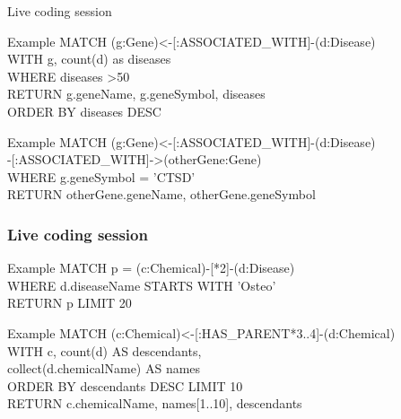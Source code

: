 \documentclass[12pt]{beamer}
\begin{document}
    \begin{frame}{Live coding session}
        \begin{block}{Example}
            MATCH (g:Gene)\textless-[:ASSOCIATED\_WITH]-(d:Disease)\\
            \hspace{1cm} WITH g, count(d) as diseases\\
            \hspace{1cm} WHERE diseases \textgreater 50\\
            \hspace{1cm} RETURN g.geneName, g.geneSymbol, diseases\\
            \hspace{1cm} ORDER BY diseases DESC
        \end{block}
        \begin{block}{Example}
            MATCH (g:Gene)\textless-[:ASSOCIATED\_WITH]-(d:Disease)\\
            \hspace{1cm}-[:ASSOCIATED\_WITH]-\textgreater(otherGene:Gene)\\
            \hspace{1cm} WHERE g.geneSymbol = 'CTSD'\\
            RETURN otherGene.geneName, otherGene.geneSymbol
        \end{block}
    \end{frame}
    
    \begin{frame}
        \frametitle{Live coding session}
        \begin{block}{Example}
            MATCH p = (c:Chemical)-[*2]-(d:Disease)\\
            \hspace{1cm} WHERE d.diseaseName STARTS WITH 'Osteo'\\
            \hspace{1cm} RETURN p LIMIT 20
        \end{block}
        \begin{block}{Example}
            MATCH (c:Chemical)\textless-[:HAS\_PARENT*3..4]-(d:Chemical)\\ 
            \hspace{1cm} WITH c, count(d) AS descendants,\\
            \hspace{1cm} collect(d.chemicalName) AS names\\
            \hspace{1cm} ORDER BY descendants DESC LIMIT 10\\
            RETURN c.chemicalName, names[1..10], descendants
        \end{block}
    \end{frame}
    
\end{document}
